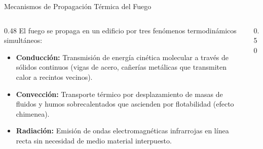 \begin{frame}{Mecanismos de Propagación Térmica del Fuego}
  \begin{columns}[c]
    \begin{column}{0.48\textwidth}
      \small
      El fuego se propaga en un edificio por tres fenómenos termodinámicos simultáneos:
      \begin{itemize}
        \scriptsize
        \item \textbf{Conducción:} Transmisión de energía cinética molecular a través de sólidos continuos (vigas de acero, cañerías metálicas que transmiten calor a recintos vecinos).
        \item \textbf{Convección:} Transporte térmico por desplazamiento de masas de fluidos y humos sobrecalentados que ascienden por flotabilidad (efecto chimenea).
        \item \textbf{Radiación:} Emisión de ondas electromagnéticas infrarrojas en línea recta sin necesidad de medio material interpuesto.
      \end{itemize}
    \end{column}

    \begin{column}{0.50\textwidth}
      \centering
    \end{column}
  \end{columns}
\end{frame}

